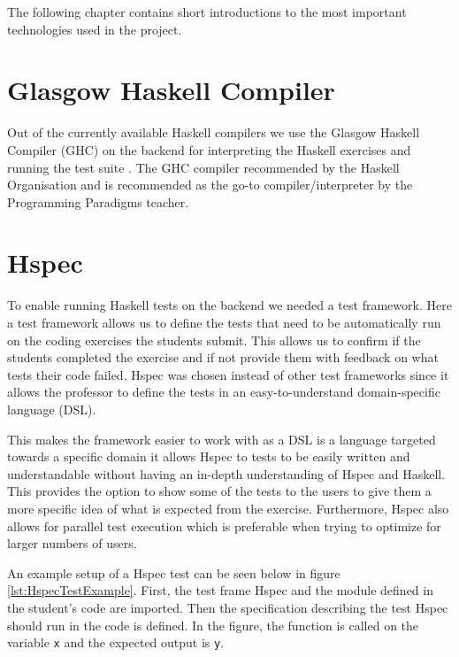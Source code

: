The following chapter contains short introductions to the most important technologies used in the project. 

\section*{Glasgow Haskell Compiler} %
Out of the currently available Haskell compilers we use the Glasgow Haskell Compiler (GHC) on the backend for interpreting the Haskell exercises  and running the test suite . The GHC compiler recommended by the Haskell Organisation and is recommended as the go-to compiler/interpreter by the Programming Paradigms teacher.


\section*{Hspec}
To enable running Haskell tests on the backend we needed a test framework. Here a test framework allows us to define the tests that need to be automatically run on the coding exercises the students submit. This allows us to confirm if the students completed the exercise and if not provide them with feedback on what tests their code failed.
Hspec was chosen instead of other test frameworks since it allows the professor to define the tests in an easy-to-understand domain-specific language (DSL). 

This makes the framework easier to work with as a DSL is a language targeted towards a specific domain it allows Hspec to tests to be easily written and understandable without having an in-depth understanding of Hspec and Haskell. 
This provides the option to show some of the tests to the users to give them a more specific idea of what is expected from the exercise. 
Furthermore, Hspec also allows for parallel test execution which is preferable when trying to optimize for larger numbers of users.

An example setup of a Hspec test can be seen below in figure \ref{lst:HspecTestExample}. First, the test frame Hspec and the module defined in the student's code are imported. Then the specification describing the test Hspec should run in the code is defined. In the figure, the function is called on the variable \texttt{x} and the expected output is \texttt{y}.


